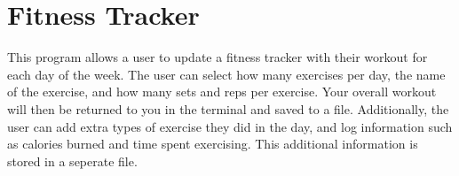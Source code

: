 \chapter{Fitness Tracker}
\hypertarget{index}{}\label{index}
\label{index_md__c_1_2_users_2medhi_2_one_drive_01-_01_technological_01_university_01_dublin_21st_01_year_2_documents_2_git_hub_2_t_u821-_fitness-_tracker_2_r_e_a_d_m_e}%
%
 This program allows a user to update a fitness tracker with their workout for each day of the week. The user can select how many exercises per day, the name of the exercise, and how many sets and reps per exercise. Your overall workout will then be returned to you in the terminal and saved to a file. Additionally, the user can add extra types of exercise they did in the day, and log information such as calories burned and time spent exercising. This additional information is stored in a seperate file. 
